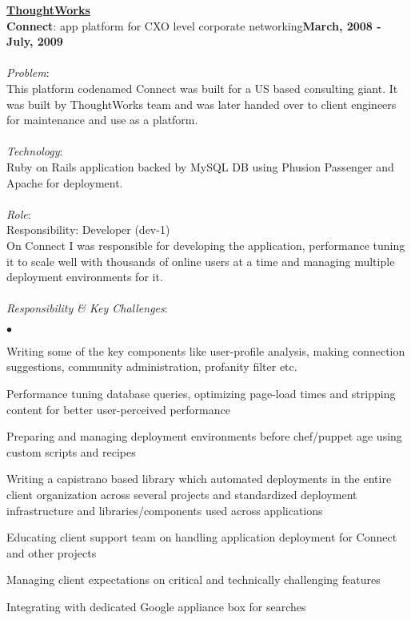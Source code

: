 \documentclass[margin,line]{res}
\newenvironment{list2}{
  \begin{list}{$\bullet$}{%
      \setlength{\itemsep}{0in}
      \setlength{\parsep}{0in} \setlength{\parskip}{0in}
      \setlength{\topsep}{0in} \setlength{\partopsep}{0in} 
      \setlength{\leftmargin}{0.2in}}}{\end{list}}
\begin{document}
\begin{resume}
{\underline {\bf ThoughtWorks}}\\
\vspace{-.1cm}
{\bf Connect}: app platform for CXO level corporate networking\hfill {\bf March, 2008 - July, 2009}\\
\vspace{-.2cm}\\
{\em Problem}:\\
This platform codenamed Connect was built for a US based consulting giant. It was built by ThoughtWorks team and was later handed over to client engineers for maintenance and use as a platform.\\
\\
{\em Technology}:\\
Ruby on Rails application backed by MySQL DB using Phusion Passenger and Apache for deployment.\\
\\
{\em Role}: \\
Responsibility: Developer (dev-1)\\
On Connect I was responsible for developing the application, performance tuning it to scale well with thousands of online users at a time and managing multiple deployment environments for it.\\
\\
{\em Responsibility \& Key Challenges}:
\vspace*{.05in}  
\begin{list2}
\item Writing some of the key components like user-profile analysis, making connection suggestions, community administration, profanity filter etc.
\item Performance tuning database queries, optimizing page-load times and stripping content for better user-perceived performance
\item Preparing and managing deployment environments before chef/puppet age using custom scripts and recipes
\item Writing a capistrano based library which automated deployments in the entire client organization across several projects and standardized deployment infrastructure and libraries/components used across applications
\item Educating client support team on handling application deployment for Connect and other projects 
\item Managing client expectations on critical and technically challenging features
\item Integrating with dedicated Google appliance box for searches
\end{list2}


\end{resume}
\end{document}

